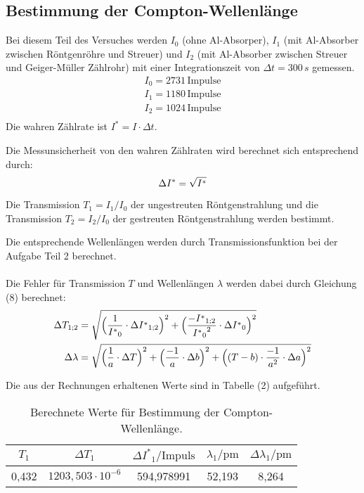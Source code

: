 \newpage
\subsection{Bestimmung der Compton-Wellenlänge }
Bei diesem Teil des Versuches werden $I_{0}$ (ohne Al-Absorper), $I_1$ (mit Al-Absorber zwischen Röntgenröhre und Streuer) und $I_{2}$ (mit Al-Absorber zwischen Streuer und
Geiger-Müller Zählrohr) mit einer Integrationszeit von \(\Delta t=300 \,s \) gemessen.
\begin{align*}
  I_{0}=2731 \, \mathrm{Impulse}\\
  I_{1}=1180 \,\mathrm{Impulse}\\
  I_{2}=1024 \, \mathrm{Impulse}\\
 \end{align*}
 Die wahren Zählrate ist \(I^{*}=I \cdot \Delta t\).

 Die Messunsicherheit von den wahren Zählraten wird berechnet sich entsprechend durch:
 \begin{equation}
  \Delta I^{*} =\sqrt{I^{*}} \\ 
 \end{equation}

 Die Transmission \(T_1={I}_{1} / I_{0}\)  der ungestreuten Röntgenstrahlung und die Transmission \(T_2=I_{2}/ I_{0}\)  der gestreuten Röntgenstrahlung werden bestimmt.

 Die entsprechende Wellenlängen werden durch Transmissionsfunktion bei der Aufgabe Teil 2 berechnet.
 \paragraph{}
 Die Fehler für Transmission $T$ und Wellenlängen $\lambda$ werden dabei durch Gleichung (8)  berechnet:
 \begin{align*}
  \Delta T_{1;2} &=\sqrt{\Bigl(\frac{1}{{I^{*}}_{0}} \cdot \Delta {I^{*}}_{1;2}\Bigr)^2+\Bigl(\frac{-{I^{*}}_{1;2}}{{{I^{*}}_{0}}^2} \cdot \Delta {I^{*}}_{0}\Bigr)^2}\\
  \Delta \lambda &=\sqrt{\Bigl(\frac{1}{a} \cdot \Delta T\Bigr)^2+\Bigl(\frac{-1}{a} \cdot \Delta b\Bigr)^2+\Bigl((T-b)\cdot\frac{-1}{a^2} \cdot \Delta a\Bigr)^2}\\
 \end{align*}
 
 Die aus der Rechnungen erhaltenen Werte sind in Tabelle (2) aufgeführt.
 \begin{table}
  \centering
  \caption{Berechnete Werte für Bestimmung der Compton-Wellenlänge.}
  \label{tab:some_data}
  \begin{tabular}{ccccc}
    \toprule
    $T_1$ & $\Delta T_1$ &  $\Delta {I^*}_1  /  \mathrm{Impuls}$ & $\lambda_1 /  \mathrm{pm} $ &  $\Delta \lambda_1 /  \mathrm{pm}$\\
    \midrule
    0,432 & $1203,503 \cdot 10^{-6}$  & 594,978991 & 52,193 & 8,264 \\
    \bottomrule
  \end{tabular}
\end{table}


